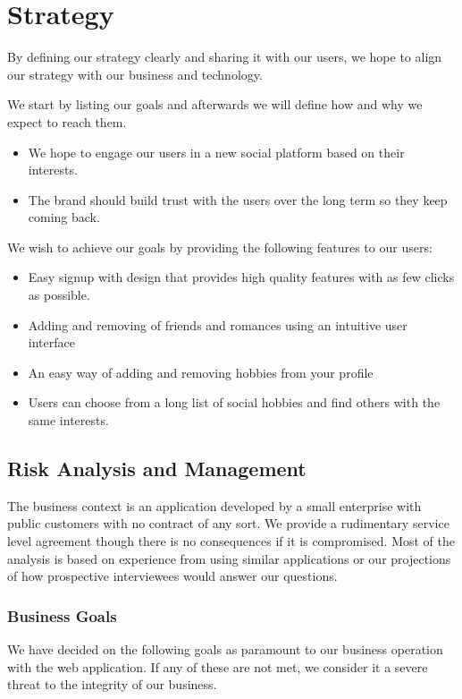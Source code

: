 \documentclass[a4paper]{article}
\begin{document}
\section{Strategy}\label{sec:strategy}
By defining our strategy clearly and sharing it with our users, we hope to align our strategy with our business and technology.

We start by listing our goals and afterwards we will define how and why we expect to reach them.

\begin{itemize}
\item
We hope to engage our users in a new social platform based on their interests.
\item
The brand should build trust with the users over the long term so they keep coming back.
\end{itemize}

We wish to achieve our goals by providing the following features to our users:
\begin{itemize}
\item Easy signup with design that provides high quality features with as few clicks as possible.
\item Adding and removing of friends and romances using an intuitive user interface
\item An easy way of adding and removing hobbies from your profile
\item Users can choose from a long list of social hobbies and find others with the same interests.
\end{itemize}

\subsection{Risk Analysis and Management}
The business context is an application developed by a small enterprise with public customers with no contract of any sort. We provide a rudimentary service level agreement though there is no consequences if it is compromised. Most of the analysis is based on experience from using similar applications or our projections of how prospective interviewees would answer our questions.
\subsubsection{Business Goals}
We have decided on the following goals as paramount to our business operation with the web application. If any of these are not met, we consider it a severe threat to the integrity of our business.
\end{document}

